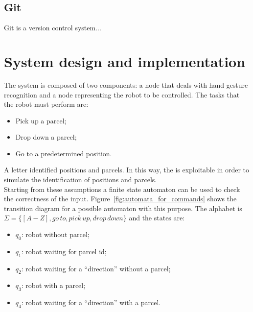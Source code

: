 \documentclass[../thesis.tex]{subfiles}
\begin{document}
\subsection{Git}
Git is a version control system...

\section{System design and implementation}\label{sec:system_design_and_implementation}
The system is composed of two components: a node that deals with  hand gesture recognition and a node representing the robot to be controlled. The tasks that the robot must perform are:
\begin{itemize}
    \item Pick up a parcel;
    \item Drop down a parcel;
    \item Go to a predetermined position.
\end{itemize}
A letter identified positions and parcels. In this way, the  is exploitable in order to simulate the identification of positions and parcels.\\
Starting from these assumptions a finite state automaton can be used to check the correctness of the input. Figure~\ref{fig:automata_for_commands} shows the transition diagram for a possible automaton with this purpose. The alphabet is $\Sigma = \{[A-Z], go\, to, pick\, up, drop\, down\}$ and the states are:
\begin{itemize}
    \item \textbf{$q_0$}: robot without parcel; 
    \item \textbf{$q_1$}: robot waiting for parcel id; 
    \item \textbf{$q_2$}: robot waiting for a ``direction'' without a parcel;
    \item \textbf{$q_3$}: robot with a parcel;
    \item \textbf{$q_4$}: robot waiting for a ``direction'' with a parcel.
\end{itemize}
\end{document}
